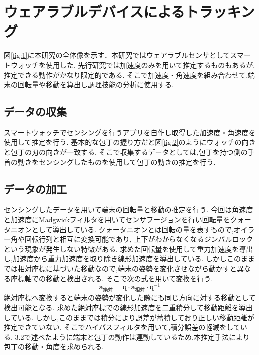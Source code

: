 \section{ウェアラブルデバイスによるトラッキング}
図\ref{fig:1}に本研究の全体像を示す．本研究ではウェアラブルセンサとしてスマートウォッチを使用した.
先行研究\cite{kumazawaanalysis}では加速度のみを用いて推定するものもあるが,推定できる動作がかなり限定的である.
そこで加速度・角速度を組み合わせて,端末の回転量や移動を算出し調理技能の分析に使用する.


\subsection{データの収集}
スマートウォッチでセンシングを行うアプリを自作し取得した加速度・角速度を使用して推定を行う.
基本的な包丁の握り方だと図\ref{fig:2}のようにウォッチの向きと包丁の刃の向きが一致する.
そこで収集するデータとしては,包丁を持つ側の手首の動きをセンシングしたものを使用して包丁の動きの推定を行う.
\subsection{データの加工}
センシングしたデータを用いて端末の回転量と移動の推定を行う.
今回は角速度と加速度にMadgwickフィルタを用いてセンサフージョンを行い回転量をクォータニオンとして導出している.
クォータニオンとは回転の量を表すもので,オイラー角や回転行列と相互に変換可能であり,
上下がわからなくなるジンバルロックという現象が発生しない特徴がある.
求めた回転量を使用して重力加速度を導出し,加速度から重力加速度を取り除き線形加速度を導出している.
しかしこのままでは相対座標に基づいた移動なので,端末の姿勢を変化させながら動かすと異なる座標軸での移動と検出される.
そこで次の式を用いて変換を行う.
\[
\mathbf{a}_{\text{絶対}} = \mathbf{q} \cdot \mathbf{a}_{\text{相対}} \cdot \mathbf{q}^{-1}
\]
絶対座標へ変換すると端末の姿勢が変化した際にも同じ方向に対する移動として検出可能となる.
求めた絶対座標での線形加速度を二重積分して移動距離を導出している.
しかし,このままでは積分により誤差が蓄積しており正しい移動距離が推定できていない.
そこでハイパスフィルタを用いて,積分誤差の軽減をしている.
3.2で述べたように端末と包丁の動作は連動しているため,本推定手法により包丁の移動・角度を求められる.


